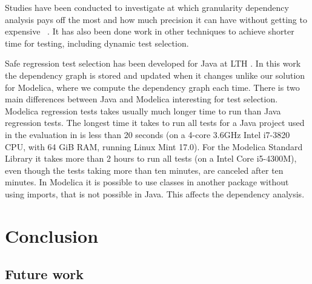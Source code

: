 \documentclass{cslthse-msc}
\begin{document}
Studies have been conducted to investigate at which granularity dependency analysis pays off the most and how much precision it can have without getting to expensive ~\cite{DBLP:conf/sigsoft/LegunsenHSLZM16}. It has also been done work in other techniques to achieve shorter time for testing, including dynamic test selection.

Safe regression test selection has been developed for Java at LTH \cite{DBLP:conf/pppj/OqvistHM16}. In this work the dependency graph is stored and updated when it changes unlike our solution for Modelica, where we compute the dependency graph each time. There is two main differences between Java and Modelica interesting for test selection. Modelica regression tests takes usually much longer time to run than Java regression tests. The longest time it takes to run all tests for a Java project used in the evaluation in \cite{DBLP:conf/pppj/OqvistHM16} is less than 20 seconds (on a 4-core 3.6GHz Intel i7-3820 CPU, with 64 GiB RAM, running Linux Mint 17.0). For the Modelica Standard Library it takes more than 2 hours to run all tests (on a Intel Core i5-4300M), even though the tests taking more than ten minutes, are canceled after ten minutes. In Modelica it is possible to use classes in another package without using imports, that is not possible in Java. This affects the dependency analysis.

\chapter[Conclusion]{Conclusion}


\section{Future work}

\printbibliography[heading=bibintoc]

\end{document}
